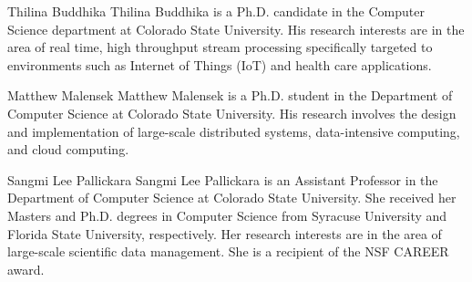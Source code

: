 \documentclass[9pt,journal,compsoc]{IEEEtran}
\begin{document}


\vspace*{-3.7\baselineskip}
\begin{IEEEbiography}{Thilina Buddhika}
Thilina Buddhika is a Ph.D. candidate in the Computer Science department at Colorado State University.  His research interests are in the area of real time, high throughput stream processing specifically targeted to environments such as Internet of Things (IoT) and health care applications.
\end{IEEEbiography}
\vspace{-1.60cm}
\begin{IEEEbiography}{Matthew Malensek}
Matthew Malensek is a Ph.D. student in the Department of Computer Science at Colorado State University. His research involves the design and implementation of large-scale distributed systems, data-intensive computing, and cloud computing.
\end{IEEEbiography}
%
\vspace{-1.60cm}
\begin{IEEEbiography}{Sangmi Lee Pallickara}
Sangmi Lee Pallickara is an Assistant Professor in the Department of Computer Science at Colorado State University. She received her Masters and Ph.D. degrees in Computer Science from Syracuse University and Florida State University, respectively. Her research interests are in the area of large-scale scientific data management. She is a recipient of the NSF CAREER award.
\end{IEEEbiography}
\end{document}
